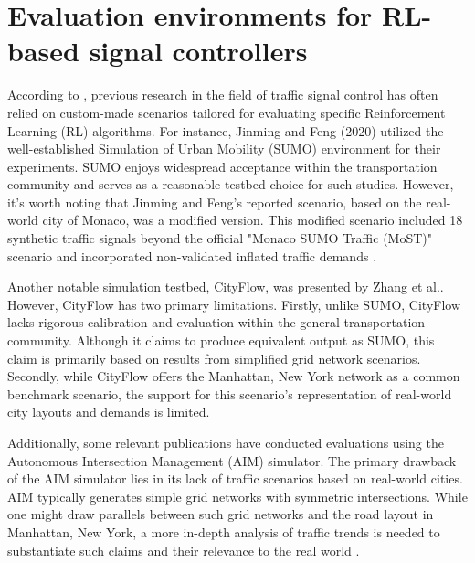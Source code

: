 \section{Evaluation environments for RL-based signal controllers} \label{sec:evaluation-environments}
According to \cite{resco}, previous research in the field of traffic signal control has often relied on custom-made scenarios tailored for evaluating specific Reinforcement Learning (RL) algorithms. For instance, Jinming and Feng (2020) utilized the well-established Simulation of Urban Mobility (SUMO) environment for their experiments. SUMO enjoys widespread acceptance within the transportation community and serves as a reasonable testbed choice for such studies. However, it's worth noting that Jinming and Feng's reported scenario, based on the real-world city of Monaco, was a modified version. This modified scenario included 18 synthetic traffic signals beyond the official "Monaco SUMO Traffic (MoST)" scenario and incorporated non-validated inflated traffic demands \cite{codeca2018monaco}.

Another notable simulation testbed, CityFlow, was presented by Zhang et al.\cite{zhang2019cityflow}. However, CityFlow has two primary limitations. Firstly, unlike SUMO, CityFlow lacks rigorous calibration and evaluation within the general transportation community. Although it claims to produce equivalent output as SUMO, this claim is primarily based on results from simplified grid network scenarios. Secondly, while CityFlow offers the Manhattan, New York network as a common benchmark scenario, the support for this scenario's representation of real-world city layouts and demands is limited.

Additionally, some relevant publications have conducted evaluations using the Autonomous Intersection Management (AIM) simulator. The primary drawback of the AIM simulator lies in its lack of traffic scenarios based on real-world cities. AIM typically generates simple grid networks with symmetric intersections. While one might draw parallels between such grid networks and the road layout in Manhattan, New York, a more in-depth analysis of traffic trends is needed to substantiate such claims and their relevance to the real world \cite{pham2013learning}\cite{dresner2008multiagent}\cite{ma2020feudal}.

